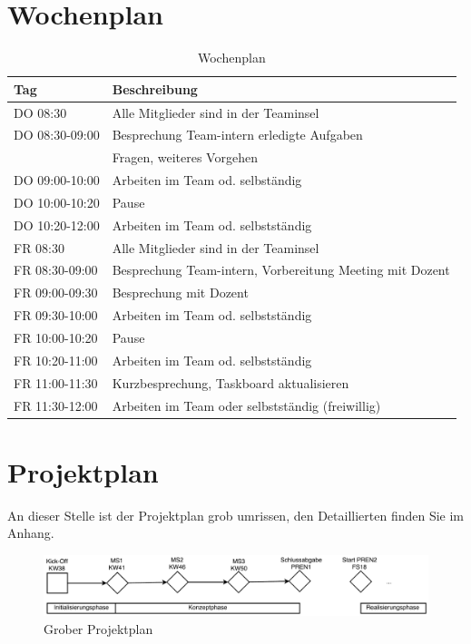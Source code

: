 \documentclass[a4paper]{report}
\begin{document}
\section{Wochenplan}
\label{sec:Wochenplan}
\begin{table}[h!]
	\begin{tabular}{|p{}|p{}|}
		\hline
		\textbf{Tag} & \textbf{Beschreibung} \\
		\hline
		DO 08:30 & Alle Mitglieder sind in der Teaminsel \\
		\hline
		DO 08:30-09:00 & Besprechung Team-intern erledigte Aufgaben \\
		& Fragen, weiteres Vorgehen \\
		\hline
		DO 09:00-10:00 & Arbeiten im Team od. selbständig \\
		\hline
		DO 10:00-10:20 & Pause \\
		\hline
		DO 10:20-12:00 & Arbeiten im Team od. selbstständig \\
		\hline
		FR 08:30 & Alle Mitglieder sind in der Teaminsel \\
		\hline
		FR 08:30-09:00 & Besprechung Team-intern, Vorbereitung Meeting mit Dozent \\
		\hline
		FR 09:00-09:30& Besprechung mit Dozent \\
		\hline
		FR 09:30-10:00 & Arbeiten im Team od. selbstständig \\
		\hline
		FR 10:00-10:20 & Pause \\
		\hline
		FR 10:20-11:00 & Arbeiten im Team od. selbstständig \\
		\hline
		FR 11:00-11:30 & Kurzbesprechung, Taskboard aktualisieren \\
		\hline
		FR 11:30-12:00 & Arbeiten im Team oder selbstständig (freiwillig)\\
		\hline
	\end{tabular}
	\caption{Wochenplan}
	\label{tab:Wochenplan}
\end{table}


\section{Projektplan}
\label{sec:Projektplan}
An dieser Stelle ist der Projektplan grob umrissen, den Detaillierten finden Sie im Anhang.

\begin{figure}[h!]
	\includegraphics[width=\linewidth,keepaspectratio]{Rahmenplan}
	\caption{Grober Projektplan}
	\label{fig:GrobProjekt}
\end{figure}
\end{document}
